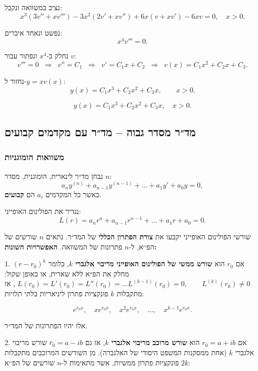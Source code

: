 \documentclass{article}
\numberwithin{equation}{section}
\begin{document}
נציב במשוואה ונקבל:
\[
x^3(3v'' + x v''') - 3x^2(2v' + x v'') + 6x(v + x v') - 6xv = 0, \quad x>0.
\]

נפשט ונאחד איברים:
\[
x^4 v''' = 0.
\]

נחלק ב-$x^{4}$ ונפתור עבור \(v\):
\[
v''' = 0 \;\;\Longrightarrow\;\; v'' = C_1 \;\;\Longrightarrow\;\; v' = C_1x + C_2 \;\;\Longrightarrow\;\; v(x) = C_1x^2 + C_2x + C_3.
\]

נחזור ל-\(y = x v(x)\):
\[
y(x) = C_1x^3 + C_2x^2 + C_3x, \qquad x>0.
\]

\[
\boxed{y(x) = C_1x^3 + C_2x^2 + C_3x, \quad x>0.}
\]

\newpage
\subsection{מד״ר מסדר גבוה – מד״ר עם מקדמים קבועים}

\subsubsection{משוואות הומוגניות}

נבחן מד״ר לינארית, הומוגנית, מסדר $n$:
\begin{equation}\label{fixed}
a_n y^{(n)} + a_{n-1}y^{(n-1)} + \dots + a_1 y' + a_0 y = 0,
\end{equation}
כאשר כל המקדמים $a_i$ הם \textbf{קבועים}.

נגדיר את הפולינום האופייני:
\begin{equation}
L(r) = a_n r^n + a_{n-1} r^{n-1} + \dots + a_1 r + a_0 = 0.
\end{equation}

שורשי הפולינום האופייני יקבעו את \textbf{צורת הפתרון הכללי} של המד״ר.
נתאים $n$ שורשים של הפ׳׳א, ל-$n$ פתרונות של המשוואה.
\textbf{האפשרויות השונות:}

1. אם $r_0$ הוא \textbf{שורש ממשי של הפולינום האופייני מריבוי אלגברי $k$}, כלומר $(r - r_0)^k$ מחלק את הפ״א ללא שארית, או באופן שקול: $L(r_{0})=L'(r_{0})=L''(r_{0})=\dots L^{(k-1)}(r_{0})=0,\qquad L^{(k)}(r_{0})\neq 0$
,
אז מתקבלות $k$ פונקציות פתרון ליניאריות בלתי תלויות:

\[
e^{r_0 x}, \quad x e^{r_0 x}, \quad x^2 e^{r_0 x}, \quad \dots, \quad x^{k-1} e^{r_0 x}.
\]

אלו יהיו הפתרונות של המד״ר.

2. אם $r_0 = a + ib$ הוא \textbf{שורש מרוכב מריבוי אלגברי $k$}, אז גם $ \bar{r}_0 = a - ib$ שורש מריבוי אלגברי $k$ (אחת ממסקנות המשפט היסודי של האלגברה).
מן השורשים המרוכבים מתקבלות $2k$ פונקציות פתרון ממשיות, אשר מתאימות ל-$n$ שורשים של הפ׳׳א:
\end{document}
